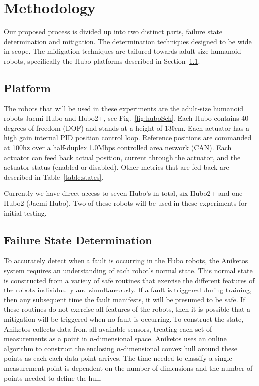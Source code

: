 \section{Methodology}

Our proposed process is divided up into two distinct parts, failure state 
determination and mitigation.  The determination techniques designed to be 
wide in scope.  The midigation techniques are tailured towards adult-size
humanoid robots, specifically the Hubo platforms described in Section~\ref{sec:platform}.

 
\subsection{Platform}\label{sec:platform}
The robots that will be used in these experiments are the adult-size 
humanoid robots Jaemi Hubo and Hubo2+, see Fig.~\ref{fig:huboSch}.  
Each Hubo contains 40 degrees of freedom (DOF) and stands at a height of 130cm.
Each actuator has a high gain internal PID position control loop.  Reference positions are
commanded at 100hz over a half-duplex 1.0Mbps controlled area network (CAN).
Each actuator can feed back actual position, current through the actuator, and the actuator status 
(enabled or disabled).  Other metrics that are fed back are described in 
Table~\ref{table:states}.  

Currently we have direct access to seven Hubo's in total, six Hubo2+ and one Hubo2 (Jaemi Hubo).
Two of these robots will be used in these experiments for initial testing.




\subsection{Failure State Determination}
\label{sub:failure_state_determination}
To accurately detect when a fault is occurring in the Hubo robots, the Aniketos system requires an understanding of each robot's normal state. This normal state is constructed from a variety of safe routines that exercise the different features of the robots individually and simultaneously. If a fault is triggered during training, then any subsequent time the fault manifests, it will be presumed to be safe. If these routines do not exercise all features of the robots, then it is possible that a mitigation will be triggered when no fault is occurring. To construct the state, Aniketos collects data from all available sensors, treating each set of measurements as a point in $n$-dimensional space. Aniketos uses an online algorithm to construct the enclosing $n$-dimensional convex hull around these points as each each data point arrives. The time needed to classify a single measurement point is dependent on the number of dimensions and the number of points needed to define the hull.

